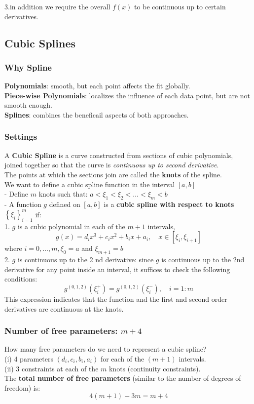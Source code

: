 \documentclass[11pt,a4paper]{article}
\begin{document}
3.in addition we require the overall $f (x)$ to be continuous up to certain derivatives.

\subsection{Cubic Splines}
\subsubsection{Why Spline}
\textbf{Polynomials}: smooth, but each point affects the fit globally.\\
\textbf{Piece-wise Polynomials}: localizes the influence of each data point, but are not smooth enough.\\
\textbf{Splines}: combines the beneficail aspects of both approaches.\\

\subsubsection{Settings}
A \textbf{Cubic Spline} is a curve constructed from sections of cubic polynomials, joined together so that the curve is \textit{continuous up to second derivative}.\\
The points at which the sections join are called the \textbf{knots} of the spline.\\

We want to define a cubic spline function in the interval $[a, b]$\\
- Define $m$ knots such that: $a<\xi_{1}<\xi_{2}<\ldots<\xi_{m}<b$\\
- A function $g$ defined on $[a, b]$ is a \textbf{cubic spline with respect to knots $\left\{\xi_{i}\right\}_{i=1}^{m}$} if:\\
1. $g$ is a cubic polynomial in each of the $m+1$ intervals,
$$
g(x)=d_{i} x^{3}+c_{i} x^{2}+b_{i} x+a_{i}, \quad x \in\left[\xi_{i}, \xi_{i+1}\right]
$$
where $i=0, \ldots, m, \xi_{0}=a$ and $\xi_{m+1}=b$\\
2. $g$ is continuous up to the 2 nd derivative: since $g$ is continuous up to the 2nd derivative for any point inside an interval, it suffices to check the following conditions:
$$
g^{(0,1,2)}\left(\xi_{i}^{+}\right)=g^{(0,1,2)}\left(\xi_{i}^{-}\right), \quad i=1: m
$$
This expression indicates that the function and the first and second order derivatives are continuous at the knots.\\

\subsubsection{Number of free parameters: $m+4$}
How many free parameters do we need to represent a cubic spline?\\
(i) 4 parameters $\left(d_{i}, c_{i}, b_{i}, a_{i}\right)$ for each of the $(m+1)$ intervals.\\
(ii) 3 constraints at each of the $m$ knots (continuity constraints).\\
The \textbf{total number of free parameters} (similar to the number of degrees of freedom) is:
$$
4(m+1)-3 m=m+4
$$
\end{document}
